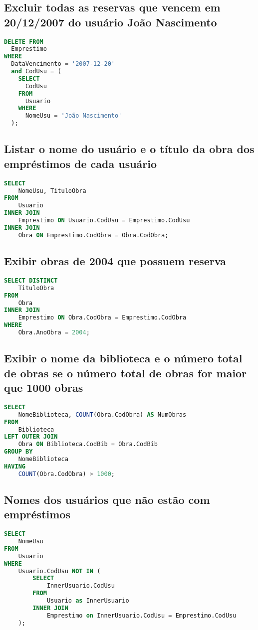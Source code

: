 \documentclass[12pt]{article}
\begin{document}
    \subsection{Excluir todas as reservas que vencem em 20/12/2007 do usuário João Nascimento}
      \begin{lstlisting}[language=SQL]
DELETE FROM
  Emprestimo
WHERE
  DataVencimento = '2007-12-20'
  and CodUsu = (
    SELECT
      CodUsu
    FROM
      Usuario
    WHERE
      NomeUsu = 'João Nascimento'
  );
      \end{lstlisting}
    \subsection{Listar o nome do usuário e o título da obra dos empréstimos de cada usuário}
      \begin{lstlisting}[language=SQL]
SELECT
    NomeUsu, TituloObra
FROM
    Usuario
INNER JOIN
    Emprestimo ON Usuario.CodUsu = Emprestimo.CodUsu
INNER JOIN
    Obra ON Emprestimo.CodObra = Obra.CodObra;
      \end{lstlisting}
    \subsection{Exibir obras de 2004 que possuem reserva}
      \begin{lstlisting}[language=SQL]
SELECT DISTINCT
    TituloObra
FROM
    Obra
INNER JOIN
    Emprestimo ON Obra.CodObra = Emprestimo.CodObra
WHERE
    Obra.AnoObra = 2004;
      \end{lstlisting}
    \subsection{Exibir o nome da biblioteca e o número total de obras se o número total de obras for maior que 1000 obras}
      \begin{lstlisting}[language=SQL]
SELECT
    NomeBiblioteca, COUNT(Obra.CodObra) AS NumObras
FROM
    Biblioteca
LEFT OUTER JOIN
    Obra ON Biblioteca.CodBib = Obra.CodBib
GROUP BY
    NomeBiblioteca
HAVING
    COUNT(Obra.CodObra) > 1000;
      \end{lstlisting}
    \subsection{Nomes dos usuários que não estão com empréstimos}
      \begin{lstlisting}[language=SQL]
SELECT
    NomeUsu
FROM
    Usuario
WHERE
    Usuario.CodUsu NOT IN (
        SELECT
            InnerUsuario.CodUsu
        FROM
            Usuario as InnerUsuario
        INNER JOIN
            Emprestimo on InnerUsuario.CodUsu = Emprestimo.CodUsu
    );
      \end{lstlisting}
\end{document}
